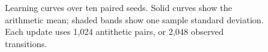 \begin{figure}[tbp]
\caption{Learning curves over ten paired seeds. Solid curves show the arithmetic mean; shaded bands show one sample standard deviation. Each update uses 1,024 antithetic pairs, or 2,048 observed transitions.}
\label{fig:learning-curves}
\end{figure}